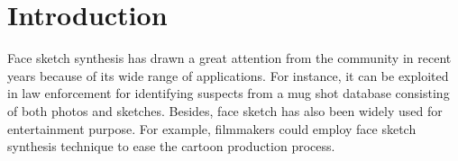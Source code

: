 \documentclass[10pt,twocolumn,letterpaper]{article}
\providecommand{\DIFaddbegin}{} %
\providecommand{\DIFaddend}{} %
\providecommand{\DIFdelbegin}{} %
\providecommand{\DIFdelend}{} %
\begin{document}
\DIFaddbegin {
\DIFaddend \section{Introduction}
\DIFdelbegin %

\DIFdelend \DIFaddbegin }
\DIFaddend Face sketch synthesis has drawn a great attention from the community in recent years because of its wide range of applications. For instance, it can be exploited in law enforcement for identifying suspects from a mug shot database consisting of both photos and sketches. Besides, face sketch has also been widely used for entertainment purpose. For example, filmmakers could employ face sketch synthesis technique to ease the cartoon production process. \DIFdelbegin %
\end{document}
